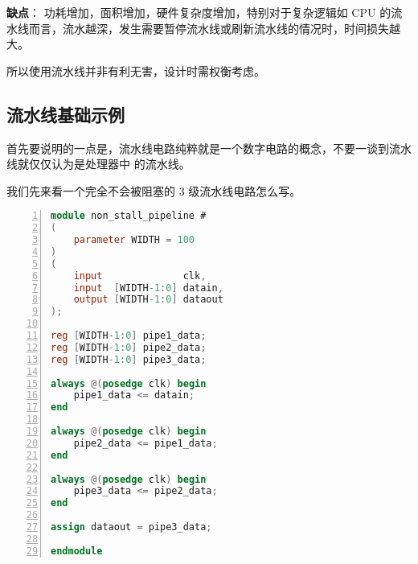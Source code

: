 \textbf{缺点}： 功耗增加，面积增加，硬件复杂度增加，特别对于复杂逻辑如 CPU 的流水线而言，流水越深，发生需要暂停流水线或刷新流水线的情况时，时间损失越大。

所以使用流水线并非有利无害，设计时需权衡考虑。


\subsection{流水线基础示例}
首先要说明的一点是，流水线电路纯粹就是一个数字电路的概念，不要一谈到流水线就仅仅认为是处理器中 的流水线。

我们先来看一个完全不会被阻塞的 3 级流水线电路怎么写。
\begin{lstlisting}[language=Verilog,label=lst:3_stage_pipeline,caption=无阻塞3级流水线实现,numbers=left,xleftmargin=5em,xrightmargin=5em, aboveskip=2em]
module non_stall_pipeline #
(
    parameter WIDTH = 100
)
(
    input              clk,
    input  [WIDTH-1:0] datain,
    output [WIDTH-1:0] dataout
);

reg [WIDTH-1:0] pipe1_data;
reg [WIDTH-1:0] pipe2_data;
reg [WIDTH-1:0] pipe3_data;

always @(posedge clk) begin
    pipe1_data <= datain;
end

always @(posedge clk) begin
    pipe2_data <= pipe1_data;
end

always @(posedge clk) begin
    pipe3_data <= pipe2_data;
end

assign dataout = pipe3_data;

endmodule
\end{lstlisting}

